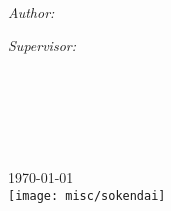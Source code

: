 \begin{titlepage}
\begin{center}
\vfill

\HRule \\[0.4cm] %
{\huge \bfseries \ttitle}\\[0.4cm] %
\HRule \\[1.5cm] %
 
\begin{minipage}{0.4\textwidth}
\begin{flushleft} \large
\emph{Author:}\\
\authornames %
\end{flushleft}
\end{minipage}
\begin{minipage}{0.4\textwidth}
\begin{flushright} \large
\emph{Supervisor:} \\
\supname %
\end{flushright}
\end{minipage}\\[4.5cm]
 
\textsc{\Large \degreename}\\[4.5cm] %
 
\large \deptname\\
\facname\\
\univname\\[2cm] %
 
{\large \today}\\[2.5cm] %
\texttt{[image: misc/sokendai]} %
 \examname
\vfill
\end{center}
\end{titlepage}
